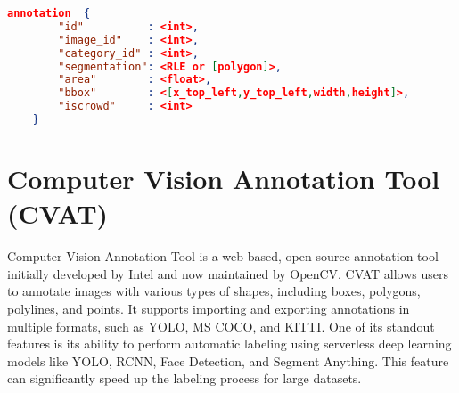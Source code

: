 \begin{lstlisting}[language=json, caption={Illutration of COCO Annotation JSON Structure}, keepspaces=true, label=lst:coco_structure] 
	annotation  {
		"id"          : <int>, 
		"image_id"    : <int>, 
		"category_id" : <int>, 
		"segmentation": <RLE or [polygon]>, 
		"area"        : <float>, 
		"bbox"        : <[x_top_left,y_top_left,width,height]>, 
		"iscrowd"     : <int> 
	}
\end{lstlisting}

\section{Computer Vision Annotation Tool (CVAT)}  \label{sec:cvat}

Computer Vision Annotation Tool \cite{cvat} is a web-based, open-source annotation tool initially developed by Intel and now maintained by OpenCV. CVAT allows users to annotate images with various types of shapes, including boxes, polygons, polylines, and points. It supports importing and exporting annotations in multiple formats, such as YOLO, MS COCO, and KITTI. One of its standout features is its ability to perform automatic labeling using serverless deep learning models like YOLO, RCNN, Face Detection, and  Segment Anything. This feature can significantly speed up the labeling process for large datasets.

